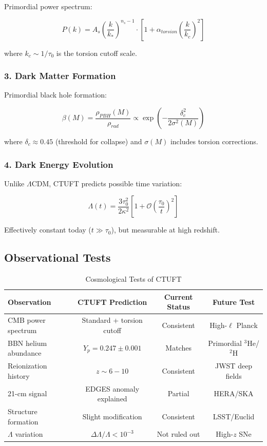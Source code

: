 Primordial power spectrum:

\begin{equation}
    P(k) = A_s \left(\frac{k}{k_*}\right)^{n_s-1} \cdot \left[1 + \alpha_{torsion} \left(\frac{k}{k_c}\right)^2\right]
\end{equation}

where $k_c \sim 1/\tau_0$ is the torsion cutoff scale.

\subsubsection{3. Dark Matter Formation}

Primordial black hole formation:

\begin{equation}
    \beta(M) = \frac{\rho_{PBH}(M)}{\rho_{rad}} \propto \exp\left(-\frac{\delta_c^2}{2\sigma^2(M)}\right)
\end{equation}

where $\delta_c \approx 0.45$ (threshold for collapse) and $\sigma(M)$ includes torsion corrections.

\subsubsection{4. Dark Energy Evolution}

Unlike $\Lambda$CDM, CTUFT predicts possible time variation:

\begin{equation}
    \Lambda(t) = \frac{3\tau_0^2}{2\kappa^2} \left[1 + \mathcal{O}\left(\frac{\tau_0}{t}\right)^2\right]
\end{equation}

Effectively constant today ($t \gg \tau_0$), but measurable at high redshift.

\subsection{Observational Tests}

\begin{table}[htbp]
\centering
\caption{Cosmological Tests of CTUFT}
\begin{tabular}{@{}lccc@{}}
\toprule
\textbf{Observation} & \textbf{CTUFT Prediction} & \textbf{Current Status} & \textbf{Future Test} \\
\midrule
CMB power spectrum & Standard + torsion cutoff & Consistent & High-$\ell$ Planck \\
BBN helium abundance & $Y_p = 0.247 \pm 0.001$ & Matches & Primordial $^3$He/$^2$H \\
Reionization history & $z \sim 6-10$ & Consistent & JWST deep fields \\
21-cm signal & EDGES anomaly explained & Partial & HERA/SKA \\
Structure formation & Slight modification & Consistent & LSST/Euclid \\
$\Lambda$ variation & $\Delta\Lambda/\Lambda < 10^{-3}$ & Not ruled out & High-$z$ SNe \\
\bottomrule
\end{tabular}
\label{tab:cosmo_tests}
\end{table}


